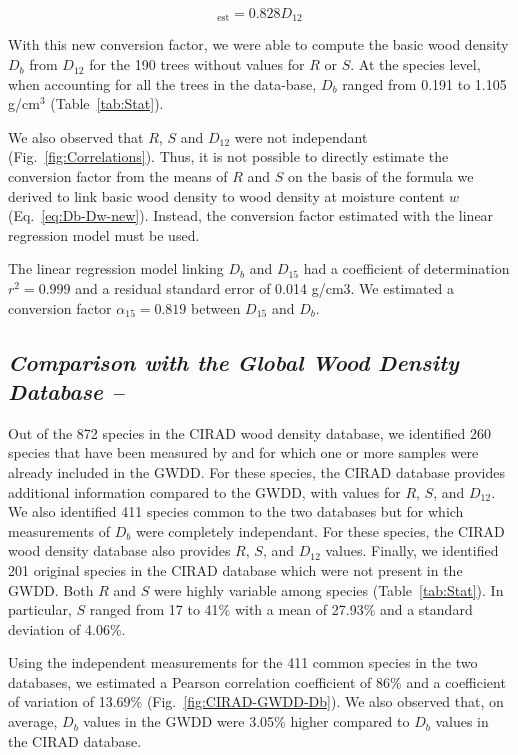 \documentclass[a4paper, 12pt, leqno, dvipsnames]{article}\usepackage[]{graphicx}\usepackage[]{color}
\begin{document}
\begin{equation}
  [D_b]_{\text{est}}=0.828 D_{12} 
  \label{eq:Db-D12}
\end{equation}

With this new conversion factor, we were able to compute the basic wood density $D_b$ from $D_{12}$ for the 190 trees without values for $R$ or $S$. At the species level, when accounting for all the trees in the data-base, $D_b$ ranged from 0.191 to 1.105 g/cm$^3$ (Table~\ref{tab:Stat}).

We also observed that $R$, $S$ and $D_{12}$ were not independant (Fig.~\ref{fig:Correlations}). Thus, it is not possible to directly estimate the conversion factor from the means of $R$ and $S$ on the basis of the formula we derived to link basic wood density to wood density at moisture content $w$ (Eq.~\ref{eq:Db-Dw-new}). Instead, the conversion factor estimated with the linear regression model must be used.

The linear regression model linking $D_b$ and $D_{15}$ had a coefficient of determination $r^2=0.999$ and a residual standard error of 0.014 g/cm$3$. We estimated a conversion factor $\alpha_{15}=0.819$ between $D_{15}$ and $D_b$.

\subsection*{\textit{Comparison with the Global Wood Density Database --}}

Out of the 872 species in the CIRAD wood density database, we identified 260 species that have been measured by \citet{Sallenave1955,Sallenave1964,Sallenave1971} and for which one or more samples were already included in the GWDD. For these species, the CIRAD database provides additional information compared to the GWDD, with values for $R$, $S$, and $D_{12}$. We also identified 411 species common to the two databases but for which measurements of $D_b$ were completely independant. For these species, the CIRAD wood density database also provides $R$, $S$, and $D_{12}$ values. Finally, we identified 201 original species in the CIRAD database which were not present in the GWDD. Both $R$ and $S$ were highly variable among species (Table~\ref{tab:Stat}). In particular, $S$ ranged from 17 to 41\% with a mean of 27.93\% and a standard deviation of 4.06\%.

Using the independent measurements for the 411 common species in the two databases, we estimated a Pearson correlation coefficient of 86\% and a coefficient of variation of 13.69\% (Fig.~\ref{fig:CIRAD-GWDD-Db}). We also observed that, on average, $D_b$ values in the GWDD were 3.05\% higher compared to $D_b$ values in the CIRAD database.
\end{document}
